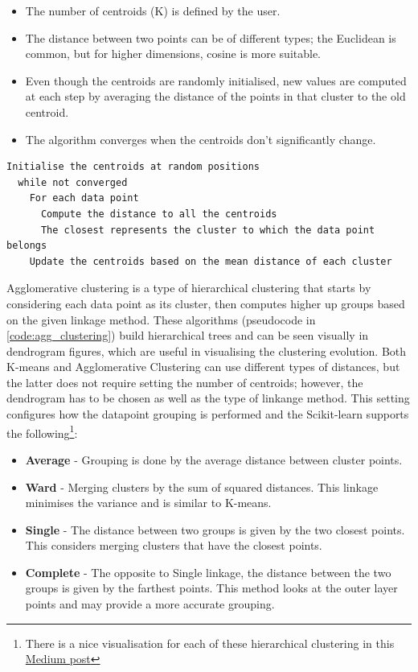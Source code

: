 \begin{itemize}
  \item The number of centroids (K) is defined by the user.
  \item The distance between two points can be of different types; the Euclidean is common, but for higher dimensions, cosine is more suitable.
  \item Even though the centroids are randomly initialised, new values are computed at each step by averaging the distance of the points in that cluster to the old centroid.
  \item The algorithm converges when the centroids don't significantly change.
\end{itemize}

\begin{lstlisting}[caption={K-means pseudocode}, label={code:k-means}]
  Initialise the centroids at random positions
  while not converged 
    For each data point
      Compute the distance to all the centroids
      The closest represents the cluster to which the data point belongs
    Update the centroids based on the mean distance of each cluster
\end{lstlisting} 

Agglomerative clustering is a type of hierarchical clustering that starts by considering each data point as its cluster, then computes higher up groups based on the given linkage method. These algorithms (pseudocode in \cref{code:agg_clustering}) build hierarchical trees and can be seen visually in dendrogram figures, which are useful in visualising the clustering evolution. Both K-means and Agglomerative Clustering can use different types of distances, but the latter does not require setting the number of centroids; however, the dendrogram has to be chosen as well as the type of linkange method. This setting configures how the datapoint grouping is performed and the Scikit-learn supports the following\footnote{There is a nice visualisation for each of these hierarchical clustering in this \href{https://towardsdatascience.com/machine-learning-algorithms-part-12-hierarchical-agglomerative-clustering-example-in-python-1e18e0075019}{Medium post}}:
\begin{itemize}
  \item \textbf{Average} - Grouping is done by the average distance between cluster points.
  \item \textbf{Ward} - Merging clusters by the sum of squared distances. This linkage minimises the variance and is similar to K-means.
  \item \textbf{Single} - The distance between two groups is given by the two closest points. This considers merging clusters that have the closest points.
  \item \textbf{Complete} - The opposite to Single linkage, the distance between the two groups is given by the farthest points. This method looks at the outer layer points and may provide a more accurate grouping.
\end{itemize}

